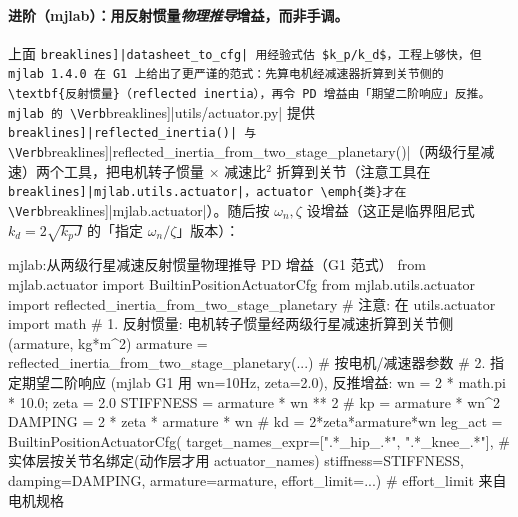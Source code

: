 \paragraph{进阶（mjlab）：用反射惯量\emph{物理推导}增益，而非手调。}上面 \Verb[breaklines]|datasheet_to_cfg| 用经验式估 $k_p/k_d$，工程上够快，但 mjlab 1.4.0 在 G1 上给出了更严谨的范式：先算电机经减速器折算到关节侧的\textbf{反射惯量}（reflected inertia），再令 PD 增益由「期望二阶响应」反推。mjlab 的 \Verb[breaklines]|utils/actuator.py| 提供 \Verb[breaklines]|reflected_inertia()| 与 \Verb[breaklines]|reflected_inertia_from_two_stage_planetary()|（两级行星减速）两个工具，把电机转子惯量 $\times$ 减速比$^2$ 折算到关节（注意工具在 \Verb[breaklines]|mjlab.utils.actuator|，actuator \emph{类}才在 \Verb[breaklines]|mjlab.actuator|）。随后按 $\omega_n,\zeta$ 设增益（这正是临界阻尼式 $k_d=2\sqrt{k_p J}$ 的「指定 $\omega_n/\zeta$」版本）：

\begin{codebox}[Python]{mjlab:从两级行星减速反射惯量物理推导 PD 增益（G1 范式）}
from mjlab.actuator import BuiltinPositionActuatorCfg
from mjlab.utils.actuator import reflected_inertia_from_two_stage_planetary  # 注意: 在 utils.actuator
import math
# 1. 反射惯量: 电机转子惯量经两级行星减速折算到关节侧 (armature, kg*m^2)
armature = reflected_inertia_from_two_stage_planetary(...)   # 按电机/减速器参数
# 2. 指定期望二阶响应 (mjlab G1 用 wn=10Hz, zeta=2.0), 反推增益:
wn = 2 * math.pi * 10.0; zeta = 2.0
STIFFNESS = armature * wn ** 2                # kp = armature * wn^2
DAMPING   = 2 * zeta * armature * wn          # kd = 2*zeta*armature*wn
leg_act = BuiltinPositionActuatorCfg(
    target_names_expr=[".*_hip_.*", ".*_knee_.*"],   # 实体层按关节名绑定(动作层才用 actuator_names)
    stiffness=STIFFNESS, damping=DAMPING, armature=armature,
    effort_limit=...)                          # effort_limit 来自电机规格
\end{codebox}

